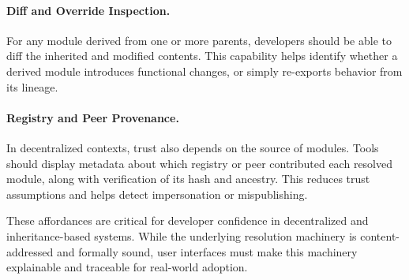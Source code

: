 \documentclass[sigplan,screen]{acmart}
\begin{document}
\paragraph{Diff and Override Inspection.}
For any module derived from one or more parents, developers should be able to diff the inherited and modified contents. This capability helps identify whether a derived module introduces functional changes, or simply re-exports behavior from its lineage.

\paragraph{Registry and Peer Provenance.}
In decentralized contexts, trust also depends on the source of modules. Tools should display metadata about which registry or peer contributed each resolved module, along with verification of its hash and ancestry. This reduces trust assumptions and helps detect impersonation or mispublishing.

These affordances are critical for developer confidence in decentralized and inheritance-based systems. While the underlying resolution machinery is content-addressed and formally sound, user interfaces must make this machinery explainable and traceable for real-world adoption.
\end{document}
